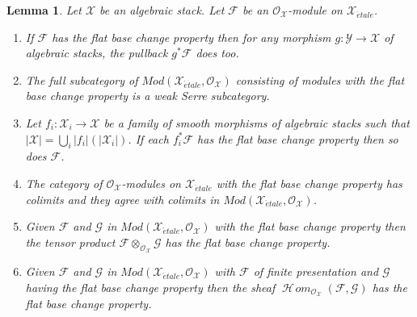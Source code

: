 \documentclass[10pt,a4paper]{amsart}
\theoremstyle{plain}
\newtheorem{lemma}[subsection]{Lemma}
\theoremstyle{definition}
\theoremstyle{remark}
\numberwithin{equation}{subsection}
\def\SheafHom{\mathop{\mathcal{H}\!\mathit{om}}\nolimits}
\def\etale{{\acute{e}tale}}
\begin{document}
\begin{lemma}
\label{lemma-check-flat-comparison-on-etale-covering}
Let $\mathcal{X}$ be an algebraic stack. Let $\mathcal{F}$
be an $\mathcal{O}_\mathcal{X}$-module on $\mathcal{X}_\etale$.
\begin{enumerate}
\item If $\mathcal{F}$ has the flat base change property then for any morphism
$g : \mathcal{Y} \to \mathcal{X}$ of algebraic stacks, the
pullback $g^*\mathcal{F}$ does too.
\item The full subcategory of
$\textit{Mod}(\mathcal{X}_\etale, \mathcal{O}_\mathcal{X})$
consisting of modules with the flat base change property
is a weak Serre subcategory.
\item  Let $f_i : \mathcal{X}_i \to \mathcal{X}$ be a family of
smooth morphisms of algebraic stacks such that
$|\mathcal{X}| = \bigcup_i |f_i|(|\mathcal{X}_i|)$. If each
$f_i^*\mathcal{F}$ has the flat base change property then so does
$\mathcal{F}$.
\item The category of $\mathcal{O}_\mathcal{X}$-modules
on $\mathcal{X}_\etale$ with the flat base change property
has colimits and they agree with colimits in
$\textit{Mod}(\mathcal{X}_\etale, \mathcal{O}_\mathcal{X})$.
\item Given $\mathcal{F}$ and $\mathcal{G}$ in
$\textit{Mod}(\mathcal{X}_\etale, \mathcal{O}_\mathcal{X})$
with the flat base change property then the tensor product
$\mathcal{F} \otimes_{\mathcal{O}_\mathcal{X}} \mathcal{G}$
has the flat base change property.
\item Given $\mathcal{F}$ and $\mathcal{G}$ in
$\textit{Mod}(\mathcal{X}_\etale, \mathcal{O}_\mathcal{X})$
with $\mathcal{F}$ of finite presentation and $\mathcal{G}$ having
the flat base change property then the sheaf
$\SheafHom_{\mathcal{O}_\mathcal{X}}(\mathcal{F}, \mathcal{G})$
has the flat base change property.
\end{enumerate}
\end{lemma}
\end{document}
